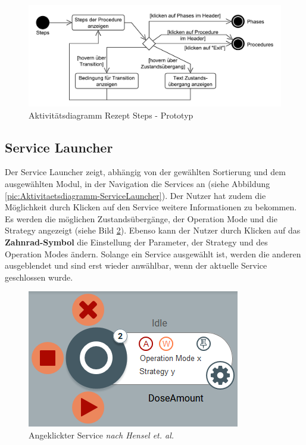 \begin{figure}[htbp]
\centering
\includegraphics[scale=0.6]{DA_files/UML/Prototyp/Aktivitaetsdiagramm-Rezept-Steps.pdf}
\caption{Aktivitätsdiagramm Rezept Steps - Prototyp}
\label{pic:Aktivitaetsdiagramm-Rezept-Steps}
\end{figure}

\subsection{Service Launcher}
Der Service Launcher zeigt, abhängig von der gewählten Sortierung und dem ausgewählten Modul, in der Navigation die Services an (siehe Abbildung \ref{pic:Aktivitaetsdiagramm-ServiceLauncher}). Der Nutzer hat zudem die Möglichkeit durch Klicken auf den Service weitere Informationen zu bekommen. Es werden die möglichen Zustandsübergänge, der Operation Mode und die Strategy angezeigt (siehe Bild \ref{pic:Service-offen}). Ebenso kann der Nutzer durch Klicken auf das \textbf{Zahnrad-Symbol} die Einstellung der Parameter, der Strategy und des Operation Modes ändern. Solange ein Service ausgewählt ist, werden die anderen ausgeblendet und sind erst wieder anwählbar, wenn der aktuelle Service geschlossen wurde.
\begin{figure}[htbp]
\centering
\includegraphics[scale=0.7]{DA_files/Bilder/Prototyp/Service-offen.png}
\caption[Angeklickter  Service \textit{nach Hensel et. al.}]{Angeklickter  Service \textit{nach Hensel et. al.} \cite{Hensel2019}}
\label{pic:Service-offen}
\end{figure}

